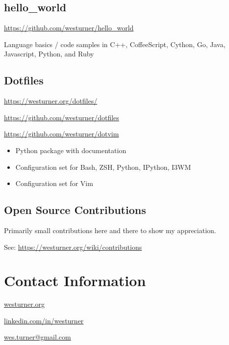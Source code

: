 \documentclass[letter,,openany,oneside]{sphinxhowto}
\begin{document}
\subsection{hello\_world}
\label{resume:hello-world}
\begin{DUlineblock}{0em}
\item[] \href{https://github.com/westurner/hello\_world}{https://github.com/westurner/hello\_world}
\end{DUlineblock}

Language basics / code samples in C++, CoffeeScript, Cython,
Go, Java, Javascript, Python, and Ruby


\subsection{Dotfiles}
\label{resume:dotfiles}
\begin{DUlineblock}{0em}
\item[] \href{https://westurner.org/dotfiles/}{https://westurner.org/dotfiles/}
\item[] \href{https://github.com/westurner/dotfiles}{https://github.com/westurner/dotfiles}
\item[] \href{https://github.com/westurner/dotvim}{https://github.com/westurner/dotvim}
\end{DUlineblock}
\begin{itemize}
\item {} 
Python package with documentation

\item {} 
Configuration set for Bash, ZSH, Python, IPython, I3WM

\item {} 
Configuration set for Vim

\end{itemize}


\subsection{Open Source Contributions}
\label{resume:open-source-contributions}
Primarily small contributions here and there to show my appreciation.

See: \href{https://westurner.org/wiki/contributions}{https://westurner.org/wiki/contributions}


\section{Contact Information}
\label{resume:contact-information}
\begin{DUlineblock}{0em}
\item[] \href{https://westurner.org}{westurner.org}
\item[] \href{http://www.linkedin.com/in/westurner}{linkedin.com/in/westurner}
\item[] \href{mailto:wes.turner@gmail.com}{wes.turner@gmail.com}
\end{DUlineblock}



\renewcommand{\indexname}{Index}
\end{document}

